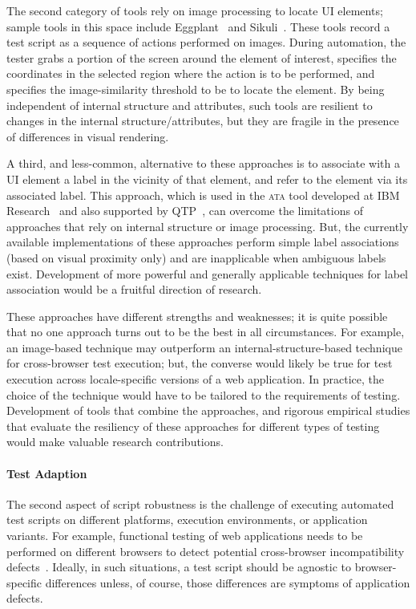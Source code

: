 The second category of tools rely on image processing to locate UI elements;
sample tools in this space include Eggplant~\cite{Eggplant} and
Sikuli~\cite{Chang:2010, Yeh:2009}. These tools record a test script as a
sequence of actions performed on images. During automation, the tester grabs a
portion of the screen around the element of interest, specifies the coordinates
in the selected region where the action is to be performed, and specifies the
image-similarity threshold to be to locate the element. By being independent of
internal structure and attributes, such tools are resilient to changes in the
internal structure/attributes, but they are fragile in the presence of
differences in visual rendering. %

A third, and less-common, alternative to these approaches is to associate with a
UI element a label in the vicinity of that element, and refer to the element via
its associated label. This approach, which is used in the \textsc{ata} tool
developed at IBM Research~\cite{thummalapenta:2012b, thummalapenta:2012a,
  thummalapenta:2013a} and also supported by QTP~\cite{hpqtp}, can overcome the
limitations of approaches that rely on internal structure or image
processing. But, the currently available implementations of these approaches
perform simple label associations (based on visual proximity only) and are
inapplicable when ambiguous labels exist. Development of more powerful and
generally applicable techniques for label association would be a fruitful
direction of research.

These approaches have different strengths and weaknesses; it is quite possible
that no one approach turns out to be the best in all circumstances. For example,
an image-based technique may outperform an internal-structure-based technique
for cross-browser test execution; but, the converse would likely be true for
test execution across locale-specific versions of a web application. In
practice, the choice of the technique would have to be tailored to the
requirements of testing.  Development of tools that combine the approaches, and
rigorous empirical studies that evaluate the resiliency of these approaches for
different types of testing would make valuable research contributions.

\vskip -5pt
\paragraph*{Test Adaption} The second aspect of script robustness is the
challenge of executing automated test scripts on different platforms, execution
environments, or application variants.  For example, functional testing of web
applications needs to be performed on different browsers to detect potential
cross-browser incompatibility
defects~\cite{Choudhary2010,Shauvik:2012,Choudhary:2013,Mesbah:2011}. Ideally,
in such situations, a test script should be agnostic to browser-specific
differences unless, of course, those differences are symptoms of application
defects.

